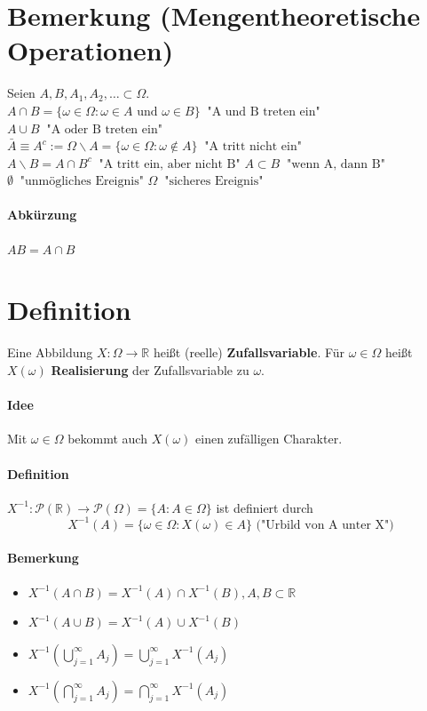 \documentclass[a4paper,11pt,notitlepage]{report}
\newcommand{\R}{{\ensuremath{\mathbb{R}}}}
\begin{document}
\section{Bemerkung (Mengentheoretische Operationen)}
Seien $A, B, A_1, A_2, \ldots \subset \Omega$.
\newline
$A \cap B = \{\omega \in \Omega : \omega \in A \text{ und } \omega \in B\} \mathop{\hat{=}}  \text{"A und B treten ein"}$
\newline
$A \cup B \mathop{\hat{=}}  \text{"A oder B treten ein"}$
\newline
$\bar{A} \equiv A^c := \Omega \backslash A = \{\omega \in \Omega : \omega \notin A \} \mathop{\hat{=}} \text{"A tritt nicht ein"}$
\newline
$A \backslash B = A \cap B^c \mathop{\hat{=}} \text{"A tritt ein, aber nicht B"}$
\newline
$A \subset B \mathop{\hat{=}} \text{"wenn A, dann B"}$
\newline
$\emptyset \mathop{\hat{=}} \text{"unmögliches Ereignis"}$
\newline
$\Omega \mathop{\hat{=}} \text{"sicheres Ereignis"}$
\newline
\paragraph{Abkürzung} $AB = A \cap B$

\section{Definition}
Eine Abbildung $X \colon \Omega \rightarrow \R$ heißt (reelle) \textbf{Zufallsvariable}. Für $\omega \in \Omega$ heißt $X(\omega)$ \textbf{Realisierung} der Zufallsvariable zu $\omega$.

\paragraph{Idee} 
Mit $\omega \in \Omega$ bekommt auch $X(\omega)$ einen zufälligen Charakter.

\paragraph{Definition}
$X^{-1} \colon \mathcal{P}(\R) \rightarrow \mathcal{P}(\Omega) = \{A \colon A \in \Omega\}$ ist definiert durch 
$$X^{-1}(A) = \{\omega \in \Omega \colon X(\omega) \in A\} \text{ ("Urbild von A unter X")}$$

\paragraph{Bemerkung}
\begin{itemize}
\item $X^{-1}(A \cap B) = X^{-1}(A) \cap X^{-1}(B), A,B \subset \R$
\item $X^{-1}(A \cup B) = X^{-1}(A) \cup X^{-1}(B)$
\item $X^{-1}(\bigcup\limits_{j=1}^{\infty}{A_j}) = \bigcup\limits_{j=1}^{\infty}{X^{-1}(A_j)}$
\item $X^{-1}(\bigcap\limits_{j=1}^{\infty}{A_j}) = \bigcap\limits_{j=1}^{\infty}{X^{-1}(A_j)}$
\end{itemize}
\end{document}
